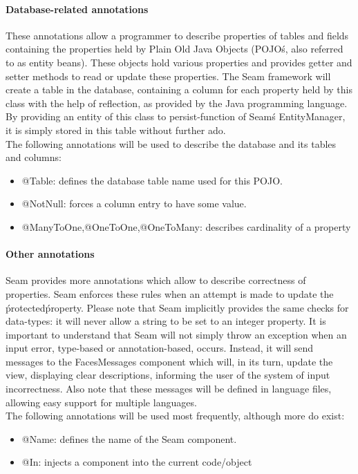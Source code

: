 \documentclass[salesmen, twoside]{../../../templates/latex/2009/softproj}
\begin{document}
\begin{projdoc}
\paragraph{Database-related annotations}
These annotations allow a programmer to describe properties of tables and fields containing the properties held by Plain Old Java Objects (POJO\'s, also referred to as  entity beans). These objects hold various properties and provides getter and setter methods to read or update these properties. The Seam framework will create a table in the database, containing a column for each property held by this class with the help of reflection, as provided by the Java programming language. By providing an entity of this class to persist-function of Seam\'s EntityManager, it is simply stored in this table without further ado.\\
The following annotations will be used to describe the database and its tables and columns:
\begin{itemize}
\item @Table: defines the database table name used for this POJO.
\item @NotNull: forces a column entry to have some value.
\item @ManyToOne,@OneToOne,@OneToMany: describes cardinality of a property
\end{itemize}

\paragraph{Other annotations}
Seam provides more annotations which allow to describe correctness of properties. Seam enforces these rules when an attempt is made to update the \'protected\' property. Please note that Seam implicitly provides the same checks for data-types: it will never allow a string to be set to an integer property. It is important to understand that Seam will not simply throw an exception when an input error, type-based or annotation-based, occurs. Instead, it will send messages to the FacesMessages component which will, in its turn, update the view, displaying clear descriptions, informing the user of the system of input incorrectness. Also note that these messages will be defined in language files, allowing easy support for multiple languages.\\
The following annotations will be used most frequently, although more do exist:
\begin{itemize}
\item @Name: defines the name of the Seam component.
\item @In: injects a component into the current code/object
\end{itemize}


\end{projdoc}
\end{document}
